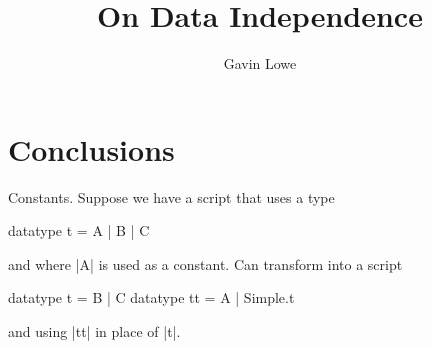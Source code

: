 \documentclass[12pt,a4paper]{article}
\title{On Data Independence}
\author{Gavin Lowe}
\begin{document}
\maketitle










\section{Conclusions}

Constants.  Suppose we have a script that uses a type
\begin{cspm}
datatype t = A | B | C
\end{cspm}
and where |A| is used as a constant.
Can transform into a script 
\begin{cspm}
datatype t = B | C
datatype tt = A | Simple.t
\end{cspm}
and using |tt| in place of |t|.


\appendix
%
%




\end{document}
